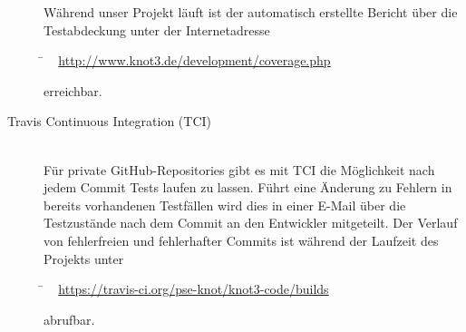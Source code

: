 \begin{description}
	Während unser Projekt läuft ist der automatisch erstellte Bericht über die Testabdeckung unter der Internetadresse
	
	\begin{tabbing}
			\= ~ \href {http://www.knot3.de/development/coverage.php}
					   {http://www.knot3.de/development/coverage.php}
					   
	\end{tabbing} erreichbar.
	\\
	
	\item[Travis Continuous Integration (TCI)] \hfill
	\\
	
	Für private GitHub-Repositories gibt es mit TCI die Möglichkeit nach jedem Commit Tests laufen zu lassen.
	Führt eine Änderung zu Fehlern in bereits vorhandenen Testfällen wird dies in einer E-Mail über die Testzustände nach dem Commit an den Entwickler mitgeteilt. Der Verlauf von fehlerfreien und fehlerhafter Commits ist während der Laufzeit des Projekts unter
	
	\begin{tabbing}
			\= ~ \href {https://travis-ci.org/pse-knot/knot3-code/builds}
		    {https://travis-ci.org/pse-knot/knot3-code/builds}
		   
	\end{tabbing} abrufbar.
	\\
	

\end{description}


